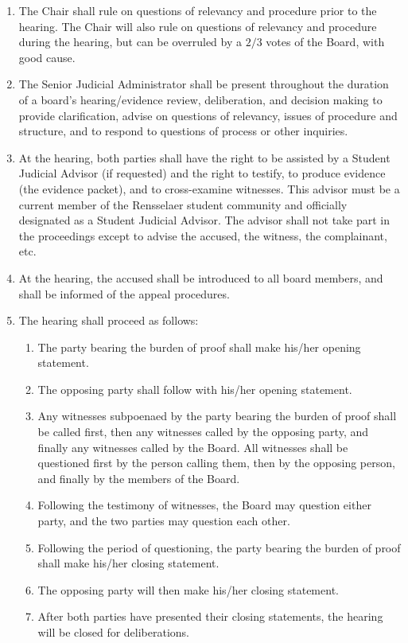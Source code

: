\begin{enumerate}
    \item The Chair shall rule on questions of relevancy and procedure prior to the hearing. The Chair will also rule on questions of relevancy and procedure during the hearing, but can be overruled by a $2/3$ votes of the Board, with good cause.
    \item The Senior Judicial Administrator shall be present throughout the duration of a board's hearing/evidence review, deliberation, and decision making to provide clarification, advise on questions of relevancy, issues of procedure and structure, and to respond to questions of process or other inquiries.
    \item At the hearing, both parties shall have the right to be assisted by a Student Judicial Advisor (if requested) and the right to testify, to produce evidence (the evidence packet), and to cross-examine witnesses. This advisor must be a current member of the Rensselaer student community and officially designated as a Student Judicial Advisor. The advisor shall not take part in the proceedings except to advise the accused, the witness, the complainant, etc.
    \item At the hearing, the accused shall be introduced to all board members, and shall be informed of the appeal procedures.
    \item The hearing shall proceed as follows:
    \begin{enumerate}
        \item The party bearing the burden of proof shall make his/her opening statement.
        \item The opposing party shall follow with his/her opening statement.
        \item Any witnesses subpoenaed by the party bearing the burden of proof shall be called first, then any witnesses called by the opposing party, and finally any witnesses called by the Board. All witnesses shall be questioned first by the person calling them, then by the opposing person, and finally by the members of the Board.
        \item Following the testimony of witnesses, the Board may question either party, and the two parties may question each other.
        \item Following the period of questioning, the party bearing the burden of proof shall make his/her closing statement.
        \item The opposing party will then make his/her closing statement.
        \item After both parties have presented their closing statements, the hearing will be closed for deliberations.

\end{enumerate}
\end{enumerate}

